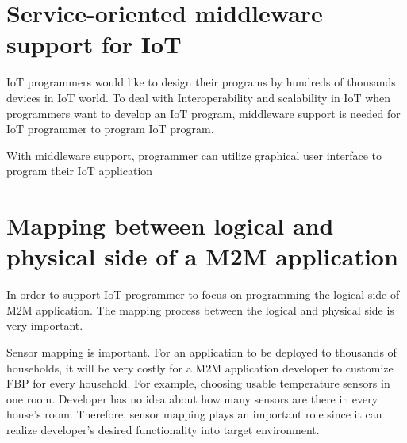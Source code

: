 \section{Service-oriented middleware support for IoT}

IoT programmers would like to design their programs by hundreds of thousands devices in IoT world. To deal with Interoperability and scalability in IoT when programmers want to develop an IoT program, middleware support is needed for IoT programmer to program IoT program. 

With middleware support, programmer can utilize graphical user interface to program their IoT application
\section{Mapping between logical and physical side of a M2M application}


In order to support IoT programmer to focus on programming the logical side of M2M application. The mapping process between the logical and physical side is very important. 

Sensor mapping is important. For an application to be deployed to thousands of households, it will be very costly for a M2M application developer to customize FBP for every household. For example, choosing usable temperature sensors in one room. Developer has no idea about how many sensors are there in every house’s room. Therefore, sensor mapping plays an important role since it can realize developer’s desired functionality into target environment.



